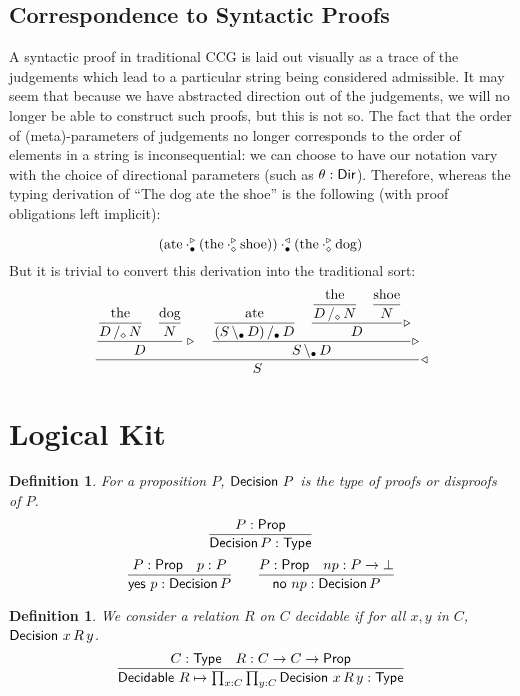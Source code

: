 \documentclass{amsart}
\newtheorem{definition}[theorem]{Definition}
\begin{document}
\subsection{Correspondence to Syntactic Proofs}

A syntactic proof in traditional CCG is laid out visually as a trace of
the judgements which lead to a particular string being considered
admissible. It may seem that because we have abstracted direction out of
the judgements, we will no longer be able to construct such proofs, but
this is not so. The fact that the order of (meta)-parameters of
judgements no longer corresponds to the order of elements in a string is
inconsequential: we can choose to have our notation vary with the choice
of directional parameters (such as $\theta:\mathsf{Dir}$). Therefore,
whereas the typing derivation of ``The dog ate the shoe'' is the
following (with proof obligations left implicit):

\[
  (\text{ate} \cdot^\triangleright_{\mathsf{\bullet}} (\text{the} \cdot^\triangleright_{\mathsf{\diamond}}
\text{shoe})) \cdot^\triangleleft_{\mathsf{\bullet}} (\text{the} \cdot^\triangleright_{\mathsf{\diamond}}
\text{dog})
\]
But it is trivial to convert this derivation into the traditional sort:
\[
  \dfrac{
    \dfrac{
      \dfrac{\text{the}}{\rarrty D|[\con\diamond]N}
      \quad
      \dfrac{\text{dog}}{N}
    }{D}\triangleright
    \quad
    \dfrac{
      \dfrac{\text{ate}}{\rarrty {(\larrty S|[\con\bullet]D)}|[\con\bullet]D}
      \quad
      \dfrac{
        \dfrac{\text{the}}{\rarrty D|[\con\diamond]N}
        \quad
        \dfrac{\text{shoe}}{N}
      }{D}\triangleright
    }{\larrty S|[\con\bullet]D}\triangleright
  }{S}\triangleleft
\]


\newpage
\appendix
\section{Logical Kit}

\begin{definition}
  For a proposition $P$, $\mathsf{Decision}\ P$ is the type of proofs or
  disproofs of $P$.
  \[
    \infer{\ty{Decision}\, P : \ty{Type}}
    {
      P : \ty{Prop}
    }
  \]
  \[
    \infer{\con{yes}\ p : \ty{Decision}\, P}
    {
      P : \ty{Prop} &
      p : P
    }
    \qquad
    \infer{\con{no}\ np : \ty{Decision}\, P}
    {
      P : \ty{Prop} &
      np : P\to\ty\bot
    }
  \]
\end{definition}

\begin{definition}
  We consider a relation $R$ on $C$ decidable if for all $x,y$ in
  $C$, $\mathsf{Decision}\ x\,R\,y$.
  \[
    \infer{\ty{Decidable}\ R \mapsto \prod_{x:C}\prod_{y:C} \ty{Decision}\ x\,R\,y : \ty{Type}}
    {
      C : \ty{Type} &
      R : C\to C\to\ty{Prop}
    }
  \]

\end{definition}
\end{document}
